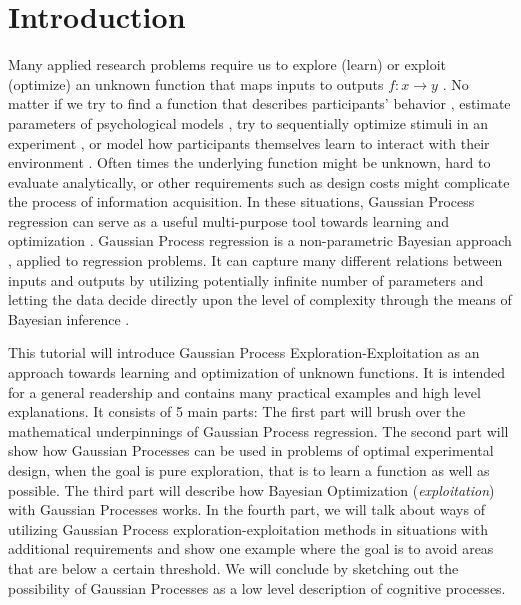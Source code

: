 \documentclass[authoryear,11pt,review]{elsarticle}
\begin{document}
\section{Introduction}
Many applied research problems require us to explore (learn) or exploit (optimize) an unknown function that maps inputs to outputs $f: x \rightarrow y$ \citep{mockus2010bayesian}. No matter if we try to find a function that describes participants' behavior \citep{cavagnaro2014functional}, estimate parameters of psychological models \citep{wetzels2010bayesian}, try to sequentially optimize stimuli in an experiment \citep{myung2009optimal}, or model how participants themselves learn to interact with their environment \citep{meder2012information}. Often times the underlying function might be unknown, hard to evaluate analytically, or other requirements such as design costs might complicate the process of information acquisition. In these situations, Gaussian Process regression can serve as a useful multi-purpose tool towards learning and optimization \citep{rasmussen2006gaussian}. Gaussian Process regression is a non-parametric Bayesian approach \citep{gershman2012tutorial},  applied to regression problems. It can capture many different relations between inputs and outputs by utilizing potentially infinite number of parameters and letting the data decide directly upon the level of complexity through the means of Bayesian inference \citep{williams1998prediction}.

This tutorial will introduce Gaussian Process Exploration-Exploitation as an approach towards learning and optimization of unknown functions. It is intended for a general readership and contains many practical examples and high level explanations. It consists of 5 main parts: The first part will brush over the mathematical underpinnings of Gaussian Process regression. The second part will show how Gaussian Processes can be used in problems of optimal experimental design, when the goal is pure exploration, that is to learn a function as well as possible. The third part will describe how Bayesian Optimization (\emph{exploitation}) with Gaussian Processes works. In the fourth part, we will talk about ways of utilizing Gaussian Process exploration-exploitation methods in situations with additional requirements and show one example where the goal is to avoid areas that are below a certain threshold. We will conclude by sketching out the possibility of Gaussian Processes as a low level description of cognitive processes.


\end{document}
